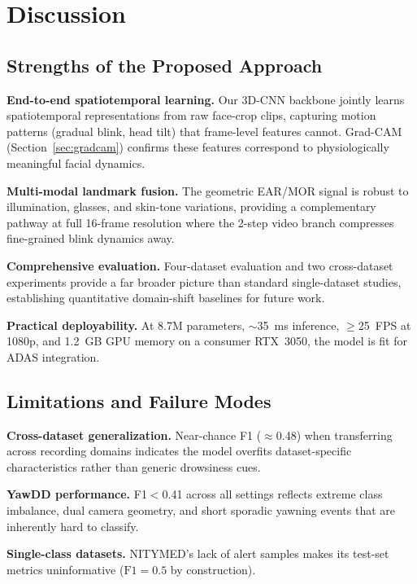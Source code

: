\documentclass[journal]{IEEEtran}
\begin{document}
\section{Discussion}
\label{sec:discussion}

\subsection{Strengths of the Proposed Approach}

\textbf{End-to-end spatiotemporal learning.} Our 3D-CNN backbone jointly learns spatiotemporal representations from raw face-crop clips, capturing motion patterns (gradual blink, head tilt) that frame-level features cannot. Grad-CAM (Section~\ref{sec:gradcam}) confirms these features correspond to physiologically meaningful facial dynamics.

\textbf{Multi-modal landmark fusion.} The geometric EAR/MOR signal is robust to illumination, glasses, and skin-tone variations, providing a complementary pathway at full 16-frame resolution where the 2-step video branch compresses fine-grained blink dynamics away.

\textbf{Comprehensive evaluation.} Four-dataset evaluation and two cross-dataset experiments provide a far broader picture than standard single-dataset studies, establishing quantitative domain-shift baselines for future work.

\textbf{Practical deployability.} At 8.7M parameters, $\sim$35~ms inference, $\geq$25~FPS at 1080p, and 1.2~GB GPU memory on a consumer RTX~3050, the model is fit for ADAS integration.

\subsection{Limitations and Failure Modes}
\label{sec:limitations}

\textbf{Cross-dataset generalization.} Near-chance F1 ($\approx$0.48) when transferring across recording domains indicates the model overfits dataset-specific characteristics rather than generic drowsiness cues.

\textbf{YawDD performance.} F1$<$0.41 across all settings reflects extreme class imbalance, dual camera geometry, and short sporadic yawning events that are inherently hard to classify.

\textbf{Single-class datasets.} NITYMED's lack of alert samples makes its test-set metrics uninformative ($\text{F1}{=}0.5$ by construction).
\end{document}
